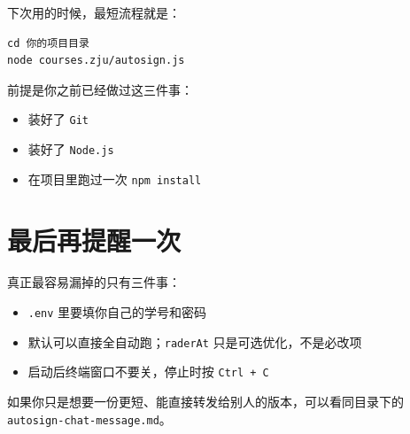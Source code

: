 \documentclass[UTF8,12pt]{ctexart}
\begin{document}
\noindent 下次用的时候，最短流程就是：

\begin{verbatim}
cd 你的项目目录
node courses.zju/autosign.js
\end{verbatim}

\noindent 前提是你之前已经做过这三件事：

\begin{itemize}
  \item 装好了 \texttt{Git}
  \item 装好了 \texttt{Node.js}
  \item 在项目里跑过一次 \texttt{npm install}
\end{itemize}

\section{最后再提醒一次}

\noindent 真正最容易漏掉的只有三件事：

\begin{itemize}
  \item \texttt{.env} 里要填你自己的学号和密码
  \item 默认可以直接全自动跑；\texttt{raderAt} 只是可选优化，不是必改项
  \item 启动后终端窗口不要关，停止时按 \texttt{Ctrl + C}
\end{itemize}

\noindent 如果你只是想要一份更短、能直接转发给别人的版本，可以看同目录下的 \texttt{autosign-chat-message.md}。
\end{document}
